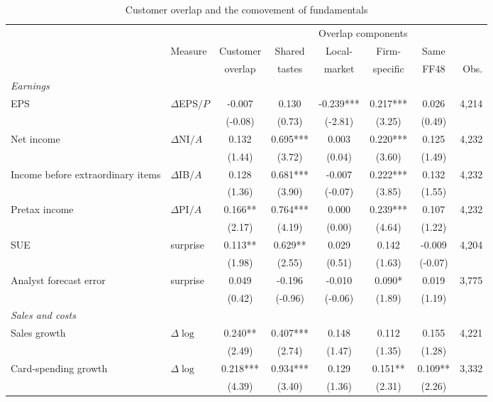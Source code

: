 \begin{table}[!htbp]\centering
\caption{Customer overlap and the comovement of fundamentals}\label{tab:fundcomove}
\scriptsize
\renewcommand{\arraystretch}{0.8}
\begin{tabular*}{\linewidth}{@{\extracolsep{\fill}}llcccccr}
\toprule
 &  &  &  & \multicolumn{2}{c}{Overlap components} &  &  \\
\cmidrule(lr){5-6}
 & Measure & Customer & Shared & Local- & Firm- & Same &  \\
 &  & overlap & tastes & market & specific & FF48 & Obs. \\
\midrule
\multicolumn{8}{l}{\emph{Earnings}} \\
\quad EPS & $\Delta$EPS$/P$ & -0.007 & 0.130 & -0.239*** & 0.217*** & 0.026 & 4,214 \\
 &  & (-0.08) & (0.73) & (-2.81) & (3.25) & (0.49) &  \\
\quad Net income & $\Delta$NI$/A$ & 0.132 & 0.695*** & 0.003 & 0.220*** & 0.125 & 4,232 \\
 &  & (1.44) & (3.72) & (0.04) & (3.60) & (1.49) &  \\
\quad Income before extraordinary items & $\Delta$IB$/A$ & 0.128 & 0.681*** & -0.007 & 0.222*** & 0.132 & 4,232 \\
 &  & (1.36) & (3.90) & (-0.07) & (3.85) & (1.55) &  \\
\quad Pretax income & $\Delta$PI$/A$ & 0.166** & 0.764*** & 0.000 & 0.239*** & 0.107 & 4,232 \\
 &  & (2.17) & (4.19) & (0.00) & (4.64) & (1.22) &  \\
\quad SUE & surprise & 0.113** & 0.629** & 0.029 & 0.142 & -0.009 & 4,204 \\
 &  & (1.98) & (2.55) & (0.51) & (1.63) & (-0.07) &  \\
\quad Analyst forecast error & surprise & 0.049 & -0.196 & -0.010 & 0.090* & 0.019 & 3,775 \\
 &  & (0.42) & (-0.96) & (-0.06) & (1.89) & (1.19) &  \\
\multicolumn{8}{l}{\emph{Sales and costs}} \\
\quad Sales growth & $\Delta\log$ & 0.240** & 0.407*** & 0.148 & 0.112 & 0.155 & 4,221 \\
 &  & (2.49) & (2.74) & (1.47) & (1.35) & (1.28) &  \\
\quad Card-spending growth & $\Delta\log$ & 0.218*** & 0.934*** & 0.129 & 0.151** & 0.109** & 3,332 \\
 &  & (4.39) & (3.40) & (1.36) & (2.31) & (2.26) &  \\

\end{tabular*}
\end{table}

